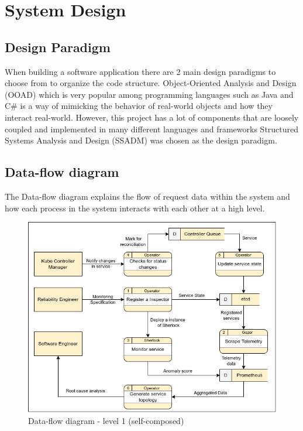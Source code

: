 \section{System Design}

\subsection{Design Paradigm}

When building a software application there are 2 main design paradigms to choose from to organize the code structure. Object-Oriented Analysis and Design (OOAD) which is very popular among programming languages such as Java and C\# is a way of mimicking the behavior of real-world objects and how they interact real-world. However, this project has a lot of components that are loosely coupled and implemented in many different languages and frameworks Structured Systems Analysis and Design (SSADM) was chosen as the design paradigm.

\subsection{Data-flow diagram}

The Data-flow diagram explains the flow of request data within the system and how each process in the system interacts with each other at a high level.

\begin{figure}[H]
    \includegraphics[width=15cm]{assets/system-design/data-flow-level-1.png}
    \caption{Data-flow diagram - level 1 (self-composed)}
\end{figure}

